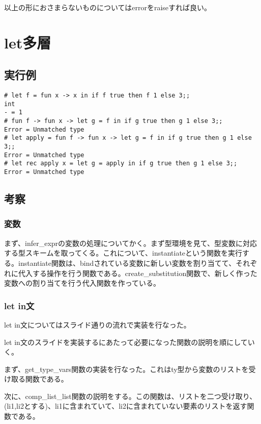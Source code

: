 \documentclass[uplatex,12pt]{jsarticle}
\begin{document}
以上の形におさまらないものについてはerrorをraiseすれば良い。

\section{let多層}
\subsection{実行例}
\begin{lstlisting}[caption=動作例]
# let f = fun x -> x in if f true then f 1 else 3;;
int
- = 1
# fun f -> fun x -> let g = f in if g true then g 1 else 3;;
Error = Unmatched type
# let apply = fun f -> fun x -> let g = f in if g true then g 1 else 3;;
Error = Unmatched type
# let rec apply x = let g = apply in if g true then g 1 else 3;;
Error = Unmatched type
\end{lstlisting}

\subsection{考察}
\subsubsection{変数}
まず、infer\_exprの変数の処理についてかく。まず型環境を見て、型変数に対応する型スキームを取ってくる。これについて、instantiateという関数を実行する。instantiate関数は、bindされている変数に新しい変数を割り当てて、それぞれに代入する操作を行う関数である。create\_substitution関数で、新しく作った変数への割り当てを行う代入関数を作っている。

\subsubsection{let in文}
let in文についてはスライド通りの流れで実装を行なった。

let in文のスライドを実装するにあたって必要になった関数の説明を順にしていく。

\vspace{12pt}

まず、get\_type\_vars関数の実装を行なった。これはty型から変数のリストを受け取る関数である。

次に、comp\_list\_list関数の説明をする。この関数は、リストを二つ受け取り、(li1,li2とする)、li1に含まれていて、li2に含まれていない要素のリストを返す関数である。

\vspace{12pt}
\end{document}
